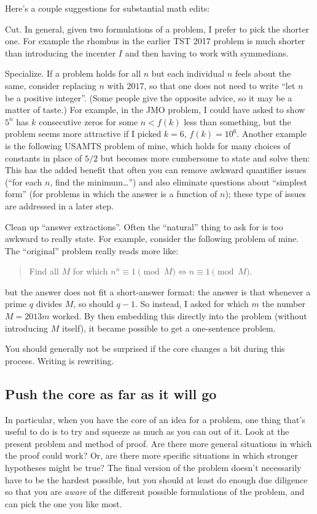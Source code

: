 \documentclass[11pt]{scrartcl}
\renewcommand{\vonenvname}{inlineprob}
\theoremstyle{inlined}
\begin{document}
\renewcommand{\vonenvname}{inlineprob}
Here's a couple suggestions for substantial math edits:
\begin{itemize}
  \ii \alert{Cut}.
  In general, given two formulations of a problem, I prefer to pick the shorter one.
  For example the rhombus in the earlier TST 2017 problem
  is much shorter than introducing the incenter $I$
  and then having to work with symmedians.

  \ii \alert{Specialize}.
  If a problem holds for all $n$ but each individual $n$
  feels about the same, consider replacing $n$ with $2017$,
  so that one does not need to write ``let $n$ be a positive integer''.
  (Some people give the opposite advice, so it may be a matter of taste.)
  For example, in the JMO problem, I could have asked to
  show $5^n$ has $k$ consecutive zeros for some $n < f(k)$ less than something,
  but the problem seems more attractive if I picked $k = 6$, $f(k) = 10^6$.
  Another example is the following USAMTS problem of mine,
  which holds for many choices of constants in place of $5/2$
  but becomes more cumbersome to state and solve then:
  This has the added benefit that often you can remove
  awkward quantifier issues (``for each $n$, find the minimum\dots'')
  and also eliminate questions about ``simplest form''
  (for problems in which the answer is a function of $n$);
  these type of issues are addressed in a later step.

  \ii \alert{Clean up ``answer extractions''}.
  Often the ``natural'' thing to ask for is too awkward to really state.
  For example, consider the following problem of mine.
  The ``original'' problem really reads more like:
  \begin{quote}
     Find all $M$ for which $n^n \equiv 1 \pmod M \iff n \equiv 1 \pmod M$.
  \end{quote}
  but the answer does not fit a short-answer format:
  the answer is that whenever a prime $q$ divides $M$, so should $q-1$.
  So instead, I asked for which $m$ the number $M = 2013m$ worked.
  By then embedding this directly into the problem (without introducing $M$ itself),
  it became possible to get a one-sentence problem.
\end{itemize}

You should generally not be surprised if the core changes
a bit during this process. Writing is rewriting.

\subsection{Push the core as far as it will go}
In particular, when you have the core of an idea for a problem,
one thing that's useful to do is to try and squeeze as much as you can out of it.
Look at the present problem and method of proof.
Are there more general situations in which the proof could work?
Or, are there more specific situations in which stronger hypotheses might be true?
The final version of the problem doesn't necessarily have to be the hardest possible,
but you should at least do enough due diligence
so that you are \emph{aware} of the different possible formulations of the problem,
and can pick the one you like most.
\end{document}
